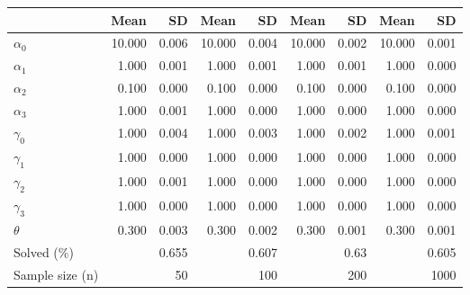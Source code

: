 
\begin{tabular}[t]{lrrrrrrrr}
\toprule
  & Mean & SD & Mean  & SD  & Mean   & SD   & Mean    & SD   \\
\midrule
$\alpha_{0}$ & 10.000 & 0.006 & 10.000 & 0.004 & 10.000 & 0.002 & 10.000 & 0.001\\
$\alpha_{1}$ & 1.000 & 0.001 & 1.000 & 0.001 & 1.000 & 0.001 & 1.000 & 0.000\\
$\alpha_{2}$ & 0.100 & 0.000 & 0.100 & 0.000 & 0.100 & 0.000 & 0.100 & 0.000\\
$\alpha_{3}$ & 1.000 & 0.001 & 1.000 & 0.000 & 1.000 & 0.000 & 1.000 & 0.000\\
$\gamma_{0}$ & 1.000 & 0.004 & 1.000 & 0.003 & 1.000 & 0.002 & 1.000 & 0.001\\
$\gamma_{1}$ & 1.000 & 0.000 & 1.000 & 0.000 & 1.000 & 0.000 & 1.000 & 0.000\\
$\gamma_{2}$ & 1.000 & 0.001 & 1.000 & 0.000 & 1.000 & 0.000 & 1.000 & 0.000\\
$\gamma_{3}$ & 1.000 & 0.000 & 1.000 & 0.000 & 1.000 & 0.000 & 1.000 & 0.000\\
$\theta$ & 0.300 & 0.003 & 0.300 & 0.002 & 0.300 & 0.001 & 0.300 & 0.001\\
Solved (\%) &  & 0.655 &  & 0.607 &  & 0.63 &  & 0.605\\
Sample size (n) &  & 50 &  & 100 &  & 200 &  & 1000\\
\bottomrule
\end{tabular}
